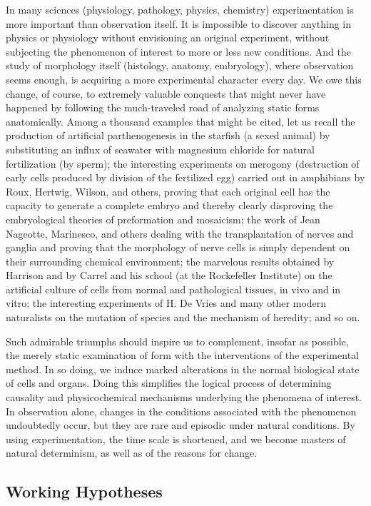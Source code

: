 \documentclass{article}
\begin{document}
In many sciences (physiology, pathology, physics, chemistry) experimentation is more important than observation itself. It is impossible to discover anything in physics or physiology without envisioning an original experiment, without subjecting the phenomenon of interest to more or less new conditions. And the study of morphology itself (histology, anatomy, embryology), where observation seems enough, is acquiring a more experimental character every day. We owe this change, of course, to extremely valuable conquests that might never have happened by following the much-traveled road of analyzing static forms anatomically. Among a thousand examples that might be cited, let us recall the production of artificial parthenogenesis in the starfish (a sexed animal) by substituting an influx of seawater with magnesium chloride for natural fertilization (by sperm); the interesting experiments on merogony (destruction of early cells produced by division of the fertilized egg) carried out in amphibians by Roux, Hertwig, Wilson, and others, proving that each original cell has the capacity to generate a complete embryo and thereby clearly disproving the embryological theories of preformation and mosaicism; the work of Jean Nageotte, Marinesco, and others dealing with the transplantation of nerves and ganglia and proving that the morphology of nerve cells is simply dependent on their surrounding chemical environment; the marvelous results obtained by Harrison and by Carrel and his school (at the Rockefeller Institute) on the artificial culture of cells from normal and pathological tissues, in vivo and in vitro; the interesting experiments of H. De Vries and many other modern naturalists on the mutation of species and the mechanism of heredity; and so on.

Such admirable triumphs should inspire us to complement, insofar as possible, the merely static examination of form with the interventions of the experimental method. In so doing, we induce marked alterations in the normal biological state of cells and organs. Doing this simplifies the logical process of determining causality and physicochemical mechanisms underlying the phenomena of interest. In observation alone, changes in the conditions associated with the phenomenon undoubtedly occur, but they are rare and episodic under natural conditions. By using experimentation, the time scale is shortened, and we become masters of natural determinism, as well as of the reasons for change.

\subsection*{Working Hypotheses}
\end{document}
